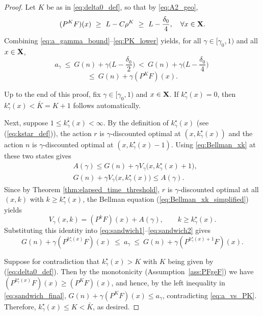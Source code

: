 \documentclass[10pt,a4paper]{amsart}
\begin{document}
\begin{proof}
\medskip
Let $K$ be as in \eqref{eq:delta0_def}, so that by \eqref{eq:A2_geo},
\begin{equation}\label{eq:PK_lower}
(P^K F)(x)\ \ge\ L-C\rho^K\ \ge\ L-\frac{\delta_0}{4},
\quad \forall x\in {{\bf X}}.
\end{equation}
Combining \eqref{eq:a_gamma_bound}--\eqref{eq:PK_lower} yields, for all $\gamma\in[\gamma_0,1)$ and all $x\in {{\bf X}}$,
\[
a_\gamma\ \le\ G(n)+\gamma\Big(L-\frac{\delta_0}{2}\Big)
\ <\ G(n)+\gamma\Big(L-\frac{\delta_0}{4}\Big)\
\]
\begin{equation}\label{eq:a_vs_PK}
\le\ G(n)+\gamma(P^K F)(x).
\end{equation}

{Up to the end of this proof,} fix $\gamma\in[{\gamma_0},1)$ and $x\in {{\bf X}}$. If $k^\star_\gamma(x)=0$, then {$k^\star_\gamma(x)<\bar{K}=K+1$} follows {automatically}.

Next, suppose $1 \le k^\star_\gamma(x) < \infty$.
By the definition of $k^\star_\gamma(x)$ (see (\ref{eq:kstar_def})), {the} action $r$ is {$\gamma$-discounted} optimal at $(x,k^\star_\gamma(x))$ and {the} action $n$ is {$\gamma$-discounted} optimal at $(x,k^\star_\gamma(x)-1)$.
Using \eqref{eq:Bellman_xk} at these two states gives
\begin{align}
&{A(\gamma)} \le G(n)+\gamma V_\gamma\big(x,k^\star_\gamma(x)+1\big), \label{eq:sandwich1}\\
&G(n)+\gamma V_\gamma\big(x,k^\star_\gamma(x)\big) \le {A(\gamma)}. \label{eq:sandwich2}
\end{align}
Since {by Theorem \ref{thm:elapsed_time_threshold}}, $r$ is {$\gamma$-discounted} optimal at all $(x,k)$ with $k\ge k^\star_\gamma(x)$, the Bellman equation {(\ref{eq:Bellman_xk_simplified})} yields
\[
V_\gamma(x,k)=(P^kF)(x)+{A(\gamma)},\qquad k\ge k^\star_\gamma(x).
\]
Substituting this identity into \eqref{eq:sandwich1}--\eqref{eq:sandwich2} gives
\begin{equation}\label{eq:sandwich_final}
G(n)+\gamma(P^{k^\star_\gamma(x)}F)(x)\ \le\ a_\gamma\ \le\ G(n)+\gamma(P^{k^\star_\gamma(x)+1}F)(x).
\end{equation}

{Suppose for contradiction that} $k^\star_\gamma(x)> K$ {with $K$ being given by (\ref{eq:delta0_def})}. Then by the monotonicity (Assumption~\ref{ass:PFgeF}) we have
$(P^{k^\star_\gamma(x)}F)(x)\ge (P^K F)(x)$, and hence, {by the left inequality in \eqref{eq:sandwich_final},}
$G(n)+\gamma(P^K F)(x)\le a_\gamma$, contradicting \eqref{eq:a_vs_PK}.
Therefore, $k^\star_\gamma(x) \le K{<\bar{K}}$, as desired.


\end{proof}
\end{document}
